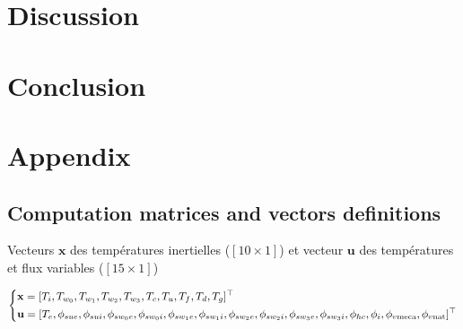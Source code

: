 \documentclass[11pt]{article}
\begin{document}
    

    

\clearpage
\section{Discussion}
\label{sec:disc}

\clearpage
\section{Conclusion}
\label{sec:conclu}



\clearpage
\printbibliography


\appendix

\clearpage
\section{Appendix} %
\label{sec:appendix}
    
    \subsection{Computation matrices and vectors definitions} %
    \label{sub:computation_matrices_and_vectors_definitions}
    Vecteurs $\mathbf{x}$ des températures inertielles ($[10\times 1]$) et vecteur $\mathbf{u}$ des températures et flux variables ($[15\times 1]$)

    \begin{equation}
          \begin{dcases}
            \mathbf{x} = [T_i, T_{w_0}, T_{w_1}, T_{w_2}, T_{w_3}, T_c, T_u, T_f, T_d, T_g]^\top \\
            \mathbf{u} = [T_e, \phi_{sue}, \phi_{sui}, \phi_{sw_0e}, \phi_{sw_0i}, \phi_{sw_1e}, \phi_{sw_1i}, \phi_{sw_2e}, \phi_{sw_2i}, \phi_{sw_3e}, \phi_{sw_3i}, \phi_{hc}, \phi_{i}, \phi_{v\mathrm{meca}}, \phi_{v\mathrm{nat}}]^\top
          \end{dcases}
        \end{equation}
\end{document}
